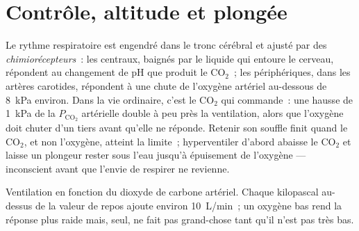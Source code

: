 \section{Contrôle, altitude et plongée}

\begin{proposition}\label{prop:b1:gas-exchange:control}
Le rythme respiratoire est engendré dans le tronc cérébral et ajusté
par des \emph{chimiorécepteurs}~: les centraux, baignés par le liquide
qui entoure le cerveau, répondent au changement de pH que produit le
$\mathrm{CO_2}$~; les périphériques, dans les artères carotides,
répondent à une chute de l'oxygène artériel au-dessous de
\qty{8}{kPa} environ. Dans la vie ordinaire, c'est le
$\mathrm{CO_2}$ qui commande~: une hausse de \qty{1}{kPa} de la
$P_{\mathrm{CO_2}}$ artérielle double à peu près la ventilation, alors que
l'oxygène doit chuter d'un tiers avant qu'elle ne réponde. Retenir son
souffle finit quand le
$\mathrm{CO_2}$, et non l'oxygène, atteint la limite~; hyperventiler d'abord
abaisse le $\mathrm{CO_2}$ et laisse un plongeur rester sous l'eau jusqu'à
épuisement de l'oxygène --- inconscient avant que l'envie de respirer
ne revienne.
\end{proposition}

\begin{omfigure}

{\small Ventilation en fonction du dioxyde de carbone artériel. Chaque
kilopascal au-dessus de la valeur de repos ajoute environ
\qty{10}{L/min}~; un oxygène bas rend la réponse plus raide mais, seul,
ne fait pas grand-chose tant qu'il n'est pas très bas.}
\end{omfigure}

